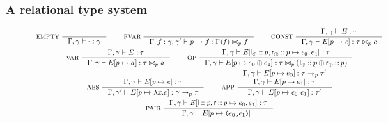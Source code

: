 \subsubsection{A relational type system}
\label{sec:rel-type-sys}

\begin{figure}
  \centering
  \begin{gather*}
    \inference[ EMPTY ]{ }{
      \Gamma, \gamma \judges \cdot : \gamma } \qquad
    \inference[ FVAR ]{ }{
      \Gamma, f : \gamma, \gamma' \judges p \mapsto f : %
      \Gamma(f) \joinctr_{p} f} \qquad
    \inference[ CONST ]{ %
      \Gamma, \gamma \judges E : \tau }{ %
      \Gamma, \gamma \judges \upd{ E }{ p }{ c } : %
      \tau \joinctr_p c } \\
    \inference[ VAR ]{ %
      \Gamma, \gamma \judges E : \tau }{ %
      \Gamma, \gamma \judges \upd{ E }{ p }{ a } : %
      \tau \joinctr_{p} a } \qquad
    \inference[ OP ]{ %
      \Gamma, \gamma \judges %
      \upd{ E }{ \leftopchild \cons p, \rightopchild \cons p}{ %
        e_0, e_1 } : \tau }{ %
      \Gamma, \gamma \judges \upd{ E }{ p }{ e_0 \oplus e_1 } : %
      \tau \joinctr_p %
      (\leftopchild \cons p \oplus \rightopchild \cons p) } \\
    \inference[ ABS ]{ 
      \Gamma, \gamma \judges \upd{ E }{ p }{ e } : \tau }{ %
      \Gamma, \gamma' \judges \upd{ E }{ p }{ \lambda x. e } : %
      \gamma \to_p \tau } \qquad
    \inference[ APP ]{ %
      \Gamma, \gamma \judges \upd{E}{p}{e_0} : \tau \to_p \tau' \\
      \Gamma, \gamma \judges \upd{E}{p}{e_1} : \tau }{
      \Gamma, \gamma \judges \upd{ E }{ p }{e_0\ e_1} : \tau' } \\
    \inference[ PAIR ]{
      \Gamma, \gamma \judges %
      \upd{E}{\leftchild \cons p, \rightchild \cons p}{ e_0, e_1 } : %
      \tau }{ %
      \Gamma, \gamma \judges \upd{E}{p}{ \pair{e_0}{e_1} } :
}
\end{gather*}
\end{figure}
